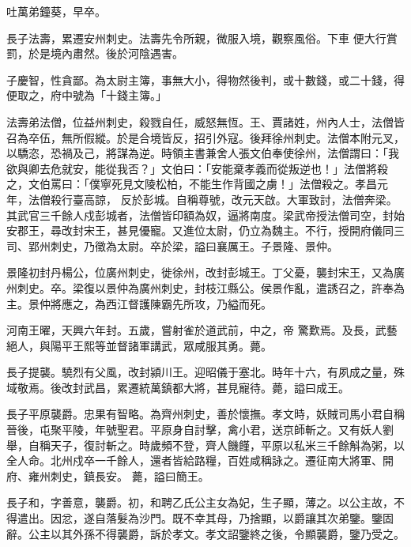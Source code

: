 \begin{pinyinscope}
 吐萬弟鐘葵，早卒。



 長子法壽，累遷安州刺史。法壽先令所親，微服入境，觀察風俗。下車
 便大行賞罰，於是境內肅然。後於河陰遇害。



 子慶智，性貪鄙。為太尉主簿，事無大小，得物然後判，或十數錢，或二十錢，得便取之，府中號為「十錢主簿。」



 法壽弟法僧，位益州刺史，殺戮自任，威怒無恆。王、賈諸姓，州內人士，法僧皆召為卒伍，無所假縱。於是合境皆反，招引外寇。後拜徐州刺史。法僧本附元叉，以驕恣，恐禍及己，將謀為逆。時領主書兼舍人張文伯奉使徐州，法僧謂曰：「我欲與卿去危就安，能從我否？」文伯曰：「安能棄孝義而從叛逆也！」法僧將殺之，文伯罵曰：「僕寧死見文陵松柏，不能生作背國之虜！」法僧殺之。孝昌元年，法僧殺行臺高諒，
 反於彭城。自稱尊號，改元天啟。大軍致討，法僧奔梁。其武官三千餘人戍彭城者，法僧皆印額為奴，逼將南度。梁武帝授法僧司空，封始安郡王，尋改封宋王，甚見優寵。又進位太尉，仍立為魏主。不行，授開府儀同三司、郢州刺史，乃徵為太尉。卒於梁，謚曰襄厲王。子景隆、景仲。



 景隆初封丹楊公，位廣州刺史，徙徐州，改封彭城王。丁父憂，襲封宋王，又為廣州刺史。卒。梁復以景仲為廣州刺史，封枝江縣公。侯景作亂，遣誘召之，許奉為主。景仲將應之，為西江督護陳霸先所攻，乃縊而死。



 河南王曜，天興六年封。五歲，嘗射雀於道武前，中之，帝
 驚歎焉。及長，武藝絕人，與陽平王熙等並督諸軍講武，眾咸服其勇。薨。



 長子提襲。驍烈有父風，改封潁川王。迎昭儀于塞北。時年十六，有夙成之量，殊域敬焉。後改封武昌，累遷統萬鎮都大將，甚見寵待。薨，謚曰成王。



 長子平原襲爵。忠果有智略。為齊州刺史，善於懷撫。孝文時，妖賊司馬小君自稱晉後，屯聚平陵，年號聖君。平原身自討擊，禽小君，送京師斬之。又有妖人劉舉，自稱天子，復討斬之。時歲頻不登，齊人饑饉，平原以私米三千餘斛為粥，以全人命。北州戍卒一千餘人，還者皆給路糧，百姓咸稱詠之。遷征南大將軍、開府、雍州刺史，鎮長安。
 薨，謚曰簡王。



 長子和，字善意，襲爵。初，和聘乙氏公主女為妃，生子顯，薄之。以公主故，不得遣出。因忿，遂自落髮為沙門。既不幸其母，乃捨顯，以爵讓其次弟鑒。鑒固辭。公主以其外孫不得襲爵，訴於孝文。孝文詔鑒終之後，令顯襲爵，鑒乃受之。




\end{pinyinscope}
